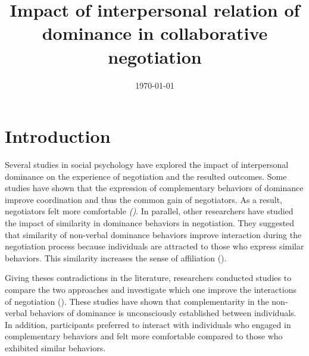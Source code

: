\documentclass[10pt, a4paper, twocolumn]{article} %
\title{Impact of interpersonal relation of dominance in collaborative negotiation} %
\date{\today} %
\begin{document}
\maketitle %

\thispagestyle{firstpage} %




\section{Introduction}


	Several studies in social psychology have explored the impact of interpersonal dominance on the experience of negotiation and the resulted outcomes. Some studies have shown that the expression of complementary behaviors of dominance improve coordination and thus the common gain of negotiators. As a result, negotiators felt more comfortable \emph{(\cite{tiedens2003power,wiltermuth2009benefits,olekalns2013dyadic})}. 
	In parallel, other researchers have studied the impact of similarity in dominance behaviors in negotiation. They suggested that similarity of non-verbal dominance behaviors improve interaction during the negotiation process because individuals are attracted to those who express similar behaviors. This similarity increases the sense of affiliation (\emph{\cite{olekalns2013dyadic}}).
	
	Giving theses contradictions in the literature, researchers conducted studies to compare the two approaches and investigate which one improve the interactions of negotiation (\cite{tiedens2003power,dryer1997opposites}). These studies have shown that complementarity in the non-verbal behaviors of dominance is unconsciously established between individuals. In addition, participants preferred to interact with individuals who engaged in complementary behaviors and felt more comfortable compared to those who exhibited similar behaviors.
	
\end{document}
